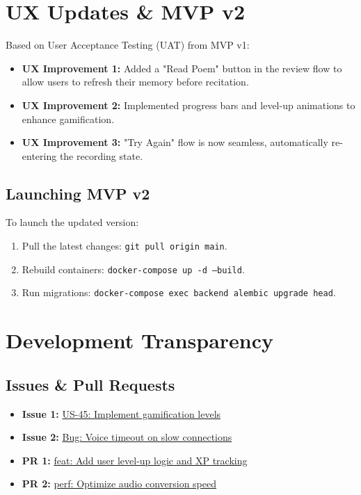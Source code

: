 \documentclass[12pt]{article}
\begin{document}
\section{UX Updates & MVP v2}

Based on User Acceptance Testing (UAT) from MVP v1:
\begin{itemize}
    \item \textbf{UX Improvement 1:} Added a "Read Poem" button in the review flow to allow users to refresh their memory before recitation.
    \item \textbf{UX Improvement 2:} Implemented progress bars and level-up animations to enhance gamification.
    \item \textbf{UX Improvement 3:} "Try Again" flow is now seamless, automatically re-entering the recording state.
\end{itemize}

\subsection{Launching MVP v2}
To launch the updated version:
\begin{enumerate}
    \item Pull the latest changes: \texttt{git pull origin main}.
    \item Rebuild containers: \texttt{docker-compose up -d --build}.
    \item Run migrations: \texttt{docker-compose exec backend alembic upgrade head}.
\end{enumerate}

\section{Development Transparency}

\subsection{Issues & Pull Requests}
\begin{itemize}
    \item \textbf{Issue 1:} \href{https://github.com/Potter32111/poetry-recommender/issues/45}{US-45: Implement gamification levels}
    \item \textbf{Issue 2:} \href{https://github.com/Potter32111/poetry-recommender/issues/46}{Bug: Voice timeout on slow connections}
    \item \textbf{PR 1:} \href{https://github.com/Potter32111/poetry-recommender/pull/12}{feat: Add user level-up logic and XP tracking}
    \item \textbf{PR 2:} \href{https://github.com/Potter32111/poetry-recommender/pull/13}{perf: Optimize audio conversion speed}
\end{itemize}
\end{document}
